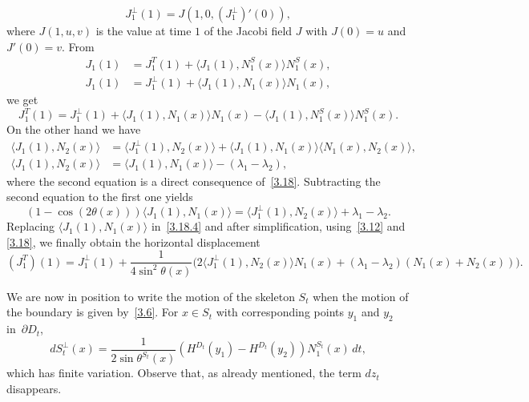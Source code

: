 \documentclass[JEP,XML,SOM,Unicode,NoFloatCountersInSection,published]{cedram}
\theoremstyle{plain}
\theoremstyle{definition}
\let\f\frac
\let\l\lambda
\begin{document}
\begin{equation}
J_1^\perp(1)=J\left(1,0,(J_1^\perp)'(0)\right),
\end{equation}
where $J(1,u,v)$ is the value at time $1$ of the Jacobi field $J$ with $J(0)=u$ and $J'(0)=v$.
From
\begin{equation}
\begin{split}
J_1(1)&=J_1^T(1)+\langle J_1(1),N_1^S(x)\rangle N_1^S(x),\\
J_1(1)&=J_1^\perp(1)+\langle J_1(1),N_1(x)\rangle N_1(x),
\end{split}
\end{equation}
we get
\begin{equation}
\label{3.18.4}
J_1^T(1)=J_1^\perp (1)+\langle J_1(1),N_1(x)\rangle N_1(x)-\langle J_1(1),N_1^S(x)\rangle N_1^S(x).
\end{equation}
On the other hand we have
\begin{equation}
\begin{split}
\langle J_1(1),N_2(x)\rangle &=\langle J_1^\perp(1),N_2(x)\rangle +\langle J_1(1),N_1(x)\rangle\langle N_1(x),N_2(x)\rangle,\\
\langle J_1(1),N_2(x)\rangle &=\langle J_1(1),N_1(x)\rangle -(\l_1-\l_2),
\end{split}
\end{equation}
where the second equation is a direct consequence of~\eqref{3.18}.
Subtracting the second equation to the first one yields
\begin{equation}
(1-\cos(2\theta(x)))\langle J_1(1),N_1(x)\rangle=\langle J_1^\perp(1),N_2(x)\rangle+\l_1-\l_2.
\end{equation}
Replacing $\langle J_1(1),N_1(x)\rangle$ in~\eqref{3.18.4} and after simplification, using~\eqref{3.12} {and \eqref{3.18},} we finally obtain the horizontal displacement
\[
(J_1^T)(1)=J_1^\perp(1)+\f1{4\sin^2\theta(x)}\bigl({2}\langle J_1^\perp(1),N_2(x)\rangle {N_1(x)}
+(\l_1-\l_2)(N_1(x)+N_2(x))\bigr).
\]

We are now in position to write the motion of the skeleton $S_t$ when the motion of the boundary is given by~\eqref{3.6}. For $x\in S_t$ with corresponding points $y_1$ and $y_2$ in~$\partial D_t$,
\begin{equation}\label{3.10}
dS_t^\perp (x)=\f{1}{2\sin\theta^{S_t}(x)}\left(H^{D_t}(y_1)-H^{D_t}(y_2)\right)N_1^{S_t}(x)\, dt,
\end{equation}
which has finite variation. Observe that, as already mentioned, the term $dz_t$ disappears.
\end{document}
